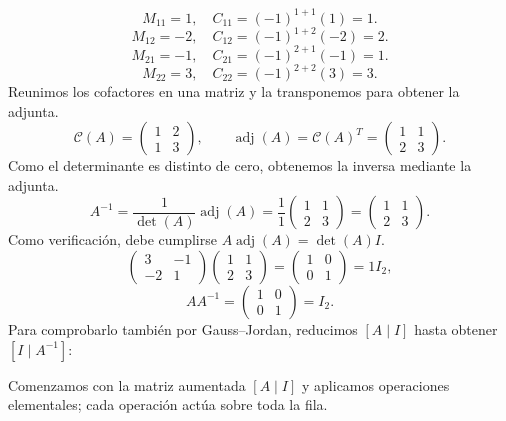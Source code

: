 \documentclass[12pt]{article}
\newcommand{\adj}{\operatorname{adj}}
\begin{document}
\[
M_{11}=1,\quad C_{11}=(-1)^{1+1}(1)=1.
\]
\[
M_{12}=-2,\quad C_{12}=(-1)^{1+2}(-2)=2.
\]
\[
M_{21}=-1,\quad C_{21}=(-1)^{2+1}(-1)=1.
\]
\[
M_{22}=3,\quad C_{22}=(-1)^{2+2}(3)=3.
\]
Reunimos los cofactores en una matriz y la transponemos para obtener la adjunta.
\[
\mathcal{C}(A)=\begin{pmatrix}1&2\\1&3\end{pmatrix},\qquad\adj(A)=\mathcal{C}(A)^T=\begin{pmatrix}1&1\\2&3\end{pmatrix}.
\]
Como el determinante es distinto de cero, obtenemos la inversa mediante la adjunta.
\[
A^{-1}=\frac1{\det(A)}\adj(A)=\frac1{1}\begin{pmatrix}1&1\\2&3\end{pmatrix}=\begin{pmatrix}1&1\\2&3\end{pmatrix}.
\]
Como verificación, debe cumplirse $A\adj(A)=\det(A)I$.
\[
\begin{pmatrix}3&-1\\-2&1\end{pmatrix}\begin{pmatrix}1&1\\2&3\end{pmatrix}=\begin{pmatrix}1&0\\0&1\end{pmatrix}=1I_{2},
\]
\[
AA^{-1}=\begin{pmatrix}1&0\\0&1\end{pmatrix}=I_{2}.
\]
Para comprobarlo también por Gauss--Jordan, reducimos $[A\mid I]$ hasta obtener $[I\mid A^{-1}]$:

Comenzamos con la matriz aumentada $[A\mid I]$ y aplicamos operaciones elementales; cada operación actúa sobre toda la fila.
\end{document}
